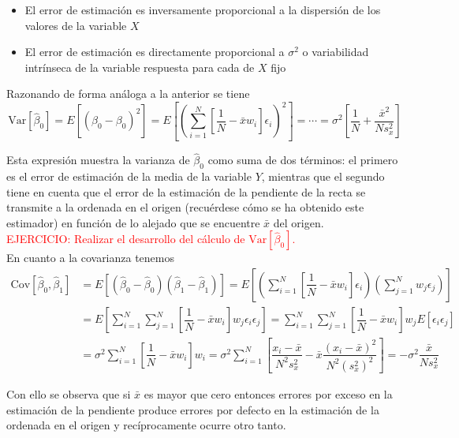 \documentclass[10pt,a4paper]{book}
\begin{document}
\begin{itemize}
\item El error de estimación es inversamente proporcional a la dispersión de los valores de la variable $X$
\item El error de estimación es directamente proporcional a $\sigma^2$ o variabilidad intrínseca de la variable respuesta para cada de $X$ fijo
\end{itemize}

Razonando de forma análoga a la anterior se tiene $$\mathrm{Var}[\widehat{\beta}_0]=E[(\widehat{\beta}_0-\beta_0)^2]=E\left[\left(\sum^N_{i=1}\left[\dfrac{1}{N}-\bar{x}w_i\right]\epsilon_i\right)^2\right]=\cdots=\sigma^2\left[\dfrac{1}{N}+\dfrac{\bar{x}^2}{Ns^2_x}\right]$$

Esta expresión muestra la varianza de $\widehat{\beta}_0$ como suma de dos términos: el primero es el error de estimación de la media de la variable $Y$, mientras que el segundo tiene en cuenta que el error de la estimación de la pendiente de la recta se transmite a la ordenada en el origen (recuérdese cómo se ha obtenido este estimador) en función de lo alejado que se encuentre $\bar{x}$ del origen.
\ \\

\textcolor{red}{EJERCICIO: Realizar el desarrollo del cálculo de $\mathrm{Var}[\widehat{\beta}_0]$.}
\ \\

En cuanto a la covarianza tenemos 
\begin{equation*}\begin{split}\mathrm{Cov}[\widehat{\beta}_0,\widehat{\beta}_1]&=E[(\widehat{\beta}_0-\widehat{\beta}_0)(\widehat{\beta}_1-\widehat{\beta}_1)]=E\left[\left(\sum^N_{i=1}\left[\dfrac{1}{N}-\bar{x}w_i\right]\epsilon_i\right)\left(\sum^N_{j=1}w_j\epsilon_j\right)\right]\\&=E\left[\sum^N_{i=1}\sum^N_{j=1}\left[\dfrac{1}{N}-\bar{x}w_i\right]w_j\epsilon_i\epsilon_j\right]=\sum^N_{i=1}\sum^N_{j=1}\left[\dfrac{1}{N}-\bar{x}w_i\right]w_jE[\epsilon_i\epsilon_j]\\&=\sigma^2\sum^N_{i=1}\left[\dfrac{1}{N}-\bar{x}w_i\right]w_i=\sigma^2\sum^N_{i=1}\left[\dfrac{x_i-\bar{x}}{N^2s^2_x}-\bar{x}\dfrac{(x_i-\bar{x})^2}{N^2(s^2_x)^2}\right]=-\sigma^2\dfrac{\bar{x}}{Ns^2_x}\end{split} 
\end{equation*}

Con ello se observa que si $\bar{x}$ es mayor que cero entonces errores por exceso en la estimación de la pendiente produce errores por defecto en la estimación de la ordenada en el origen y recíprocamente ocurre otro tanto.
\ \\
\end{document}
